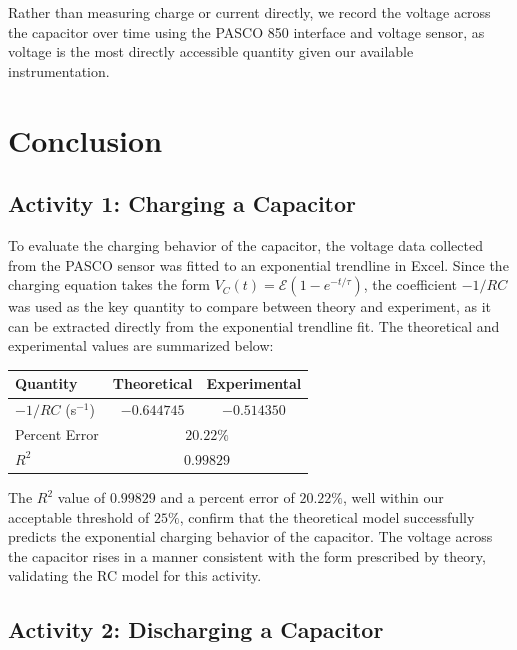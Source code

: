 \documentclass[12pt]{article}
\begin{document}
\noindent Rather than measuring charge or current directly, we record the 
voltage across the capacitor over time using the PASCO 850 interface and 
voltage sensor, as voltage is the most directly accessible quantity given our 
available instrumentation.

\section*{Conclusion}

\subsection*{Activity 1: Charging a Capacitor}

To evaluate the charging behavior of the capacitor, the voltage data
collected from the PASCO sensor was fitted to an exponential trendline
in Excel. Since the charging equation takes the form
$V_C(t) = \mathcal{E}(1 - e^{-t/\tau})$, the coefficient $-1/RC$ was
used as the key quantity to compare between theory and experiment, as
it can be extracted directly from the exponential trendline fit. The
theoretical and experimental values are summarized below:

\begin{center}
\begin{tabular}{lcc}
\toprule
\textbf{Quantity} & \textbf{Theoretical} & \textbf{Experimental} \\
\midrule
$-1/RC$ (s$^{-1}$) & $-0.644745$ & $-0.514350$ \\
Percent Error       & \multicolumn{2}{c}{$20.22\%$} \\
$R^2$               & \multicolumn{2}{c}{$0.99829$} \\
\bottomrule
\end{tabular}
\end{center}

The $R^2$ value of $0.99829$ and a percent error of $20.22\%$, well
within our acceptable threshold of $25\%$, confirm that the theoretical
model successfully predicts the exponential charging behavior of the
capacitor. The voltage across the capacitor rises in a manner consistent
with the form prescribed by theory, validating the RC model for this
activity.

\subsection*{Activity 2: Discharging a Capacitor}
\end{document}
